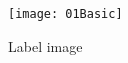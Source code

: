 \documentclass[journal, a4paper]{IEEEtran}
\begin{document}
	\begin{figure}[!hbt]
	\vspace{-1cm}
		\begin{center}
		\texttt{[image: 01Basic]}
		\caption{Label image}
		\label{fig:label}
		\end{center}
	\end{figure}	


%
%
%
%
%
%

\end{document}
